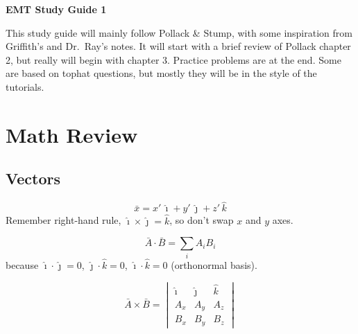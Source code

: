 \documentclass[11pt]{article}
\newcommand{\ih}{\hat{\imath}}
\newcommand{\jh}{\hat{\jmath}}
\newcommand{\kh}{\hat{k}}
\begin{document}
\begin{center}
  {\LARGE\bfseries EMT Study Guide 1}
\end{center}

This study guide will mainly follow Pollack \& Stump, with some inspiration from Griffith's and Dr.\ Ray's notes. 
It will start with a brief review of Pollack chapter 2, but really will begin with chapter 3.
Practice problems are at the end. Some are based on tophat questions, but mostly they will be in the style of the tutorials.

\section{Math Review}

\subsection{Vectors}

\begin{center}
\end{center}

\[
  \bar{x} = x'\,\ih + y'\,\jh + z'\,\kh
\]
Remember right-hand rule, $\ih\times\jh=\kh$, so don't swap $x$ and $y$ axes.

\[
  \bar{A}\cdot\bar{B} = \sum_i A_i B_i
\]
because $\ih\cdot\jh=0$, $\jh\cdot\kh=0$, $\ih\cdot\kh=0$ (orthonormal basis).

\[
  \bar{A}\times\bar{B} =
  \begin{vmatrix}
    \ih & \jh & \kh\\
    A_x & A_y & A_z\\
    B_x & B_y & B_z
  \end{vmatrix}
\]
\end{document}
